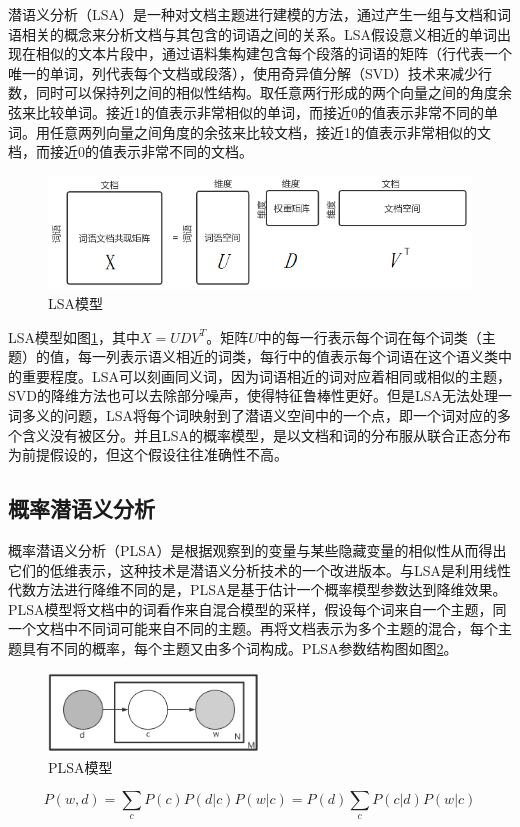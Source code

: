 \documentclass[winfonts,master,oneside,nobackinfo]{njuthesis}
\begin{document}
潜语义分析（LSA）是一种对文档主题进行建模的方法，通过产生一组与文档和词语相关的概念来分析文档与其包含的词语之间的关系。LSA假设意义相近的单词出现在相似的文本片段中，通过语料集构建包含每个段落的词语的矩阵（行代表一个唯一的单词，列代表每个文档或段落），使用奇异值分解（SVD）技术来减少行数，同时可以保持列之间的相似性结构。取任意两行形成的两个向量之间的角度余弦来比较单词。接近1的值表示非常相似的单词，而接近0的值表示非常不同的单词。用任意两列向量之间角度的余弦来比较文档，接近1的值表示非常相似的文档，而接近0的值表示非常不同的文档。

\begin{figure}[h]
\centering
\includegraphics[width=1\textwidth]{./figure/LSA.jpg}
\caption{LSA模型}
\label{lsa}
\end{figure}


LSA模型如图\ref{lsa}，其中$X = U D V ^ { T }$。矩阵$U$中的每一行表示每个词在每个词类（主题）的值，每一列表示语义相近的词类，每行中的值表示每个词语在这个语义类中的重要程度。LSA可以刻画同义词，因为词语相近的词对应着相同或相似的主题，SVD的降维方法也可以去除部分噪声，使得特征鲁棒性更好。但是LSA无法处理一词多义的问题，LSA将每个词映射到了潜语义空间中的一个点，即一个词对应的多个含义没有被区分。并且LSA的概率模型，是以文档和词的分布服从联合正态分布为前提假设的，但这个假设往往准确性不高。

\subsection{概率潜语义分析}

概率潜语义分析（PLSA）是根据观察到的变量与某些隐藏变量的相似性从而得出它们的低维表示，这种技术是潜语义分析技术的一个改进版本。与LSA是利用线性代数方法进行降维不同的是，PLSA是基于估计一个概率模型参数达到降维效果。PLSA模型将文档中的词看作来自混合模型的采样，假设每个词来自一个主题，同一个文档中不同词可能来自不同的主题。再将文档表示为多个主题的混合，每个主题具有不同的概率，每个主题又由多个词构成。PLSA参数结构图如图\ref{plsa}。

\begin{figure}[h]
\centering
\includegraphics[width=0.5\textwidth]{./figure/PLSA.jpg}
\caption{PLSA模型}
\label{plsa}
\end{figure}
$$P ( w , d ) = \sum _ { c } P ( c ) P ( d | c ) P ( w | c ) = P ( d ) \sum _ { c } P ( c | d ) P ( w | c )$$
\end{document}
